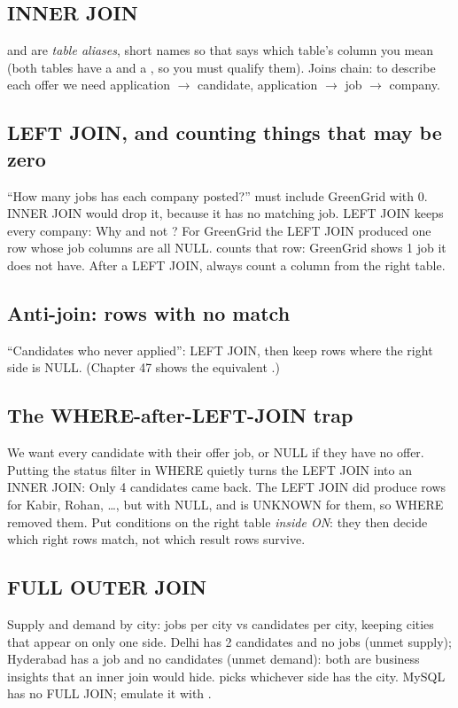 \subsection{INNER JOIN}
 and  are \emph{table aliases}, short names so that  says which table's column you mean (both tables have a
 and a , so you must qualify them). Joins chain: to describe each offer we need application $\to$ candidate, application
$\to$ job $\to$ company.

\subsection{LEFT JOIN, and counting things that may be zero}
``How many jobs has each company posted?'' must include GreenGrid with 0. INNER JOIN would drop it, because it has no matching job. LEFT JOIN keeps every
company:
Why  and not ? For GreenGrid the LEFT JOIN produced one row whose job columns are all NULL.  counts that
row:
GreenGrid shows 1 job it does not have. After a LEFT JOIN, always count a column from the right table.

\subsection{Anti-join: rows with no match}
``Candidates who never applied'': LEFT JOIN, then keep rows where the right side is NULL. (Chapter 47 shows the equivalent .)

\subsection{The WHERE-after-LEFT-JOIN trap}
We want every candidate with their offer job, or NULL if they have no offer. Putting the status filter in WHERE quietly turns the LEFT JOIN into an INNER
JOIN:
Only 4 candidates came back. The LEFT JOIN did produce rows for Kabir, Rohan, \dots, but with  NULL, and 
is UNKNOWN for them, so WHERE removed them. Put conditions on the right table \emph{inside ON}: they then decide which right rows match, not which result
rows survive.

\subsection{FULL OUTER JOIN}
Supply and demand by city: jobs per city vs candidates per city, keeping cities that appear on only one side.
Delhi has 2 candidates and no jobs (unmet supply); Hyderabad has a job and no candidates (unmet demand): both are business insights that an inner join
would hide.  picks whichever side has the city. MySQL has no FULL JOIN; emulate it with .

